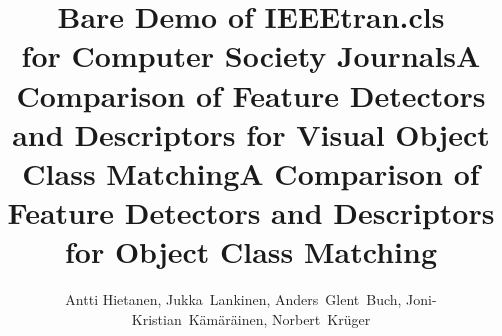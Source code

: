 \documentclass[10pt,journal,cspaper,compsoc]{IEEEtran}
\begin{document}
%
\title{Bare Demo of IEEEtran.cls\\ for Computer Society Journals}
\title{A Comparison of Feature Detectors and Descriptors for Visual Object Class Matching}
\title{A Comparison of Feature Detectors and Descriptors for Object Class Matching}

%
%
%

\author{Antti Hietanen, Jukka~Lankinen,
Anders~Glent~Buch,
Joni-Kristian~K\"am\"ar\"ainen,
Norbert~Kr\"uger%
}

%
%
%
%
\end{document}
